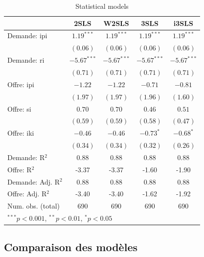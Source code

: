 \documentclass[11pt,]{article}
\begin{document}
\begin{table}[!htbp]
\begin{center}
\begin{tabular}{l c c c c }
\hline
 & 2SLS & W2SLS & 3SLS & i3SLS \\
\hline
Demande: ipi        & $1.19^{***}$  & $1.19^{***}$  & $1.19^{***}$  & $1.19^{***}$  \\
                    & $(0.06)$      & $(0.06)$      & $(0.06)$      & $(0.06)$      \\
Demande: ri         & $-5.67^{***}$ & $-5.67^{***}$ & $-5.67^{***}$ & $-5.67^{***}$ \\
                    & $(0.71)$      & $(0.71)$      & $(0.71)$      & $(0.71)$      \\
Offre: ipi          & $-1.22$       & $-1.22$       & $-0.71$       & $-0.81$       \\
                    & $(1.97)$      & $(1.97)$      & $(1.96)$      & $(1.60)$      \\
Offre: si           & $0.70$        & $0.70$        & $0.46$        & $0.51$        \\
                    & $(0.59)$      & $(0.59)$      & $(0.58)$      & $(0.47)$      \\
Offre: iki          & $-0.46$       & $-0.46$       & $-0.73^{*}$   & $-0.68^{*}$   \\
                    & $(0.34)$      & $(0.34)$      & $(0.32)$      & $(0.26)$      \\
\hline
Demande: R$^2$      & 0.88          & 0.88          & 0.88          & 0.88          \\
Offre: R$^2$        & -3.37         & -3.37         & -1.60         & -1.90         \\
Demande: Adj. R$^2$ & 0.88          & 0.88          & 0.88          & 0.88          \\
Offre: Adj. R$^2$   & -3.40         & -3.40         & -1.62         & -1.92         \\
Num. obs. (total)   & 690           & 690           & 690           & 690           \\
\hline
\multicolumn{5}{l}{\scriptsize{$^{***}p<0.001$, $^{**}p<0.01$, $^*p<0.05$}}
\end{tabular}
\caption{Statistical models}
\label{table : 2sls, w2sls, 3sls and fiml}
\end{center}
\end{table}

\FloatBarrier

\hypertarget{comparaison-des-modeles}{%
\subsection{Comparaison des modèles}\label{comparaison-des-modeles}}
\end{document}
